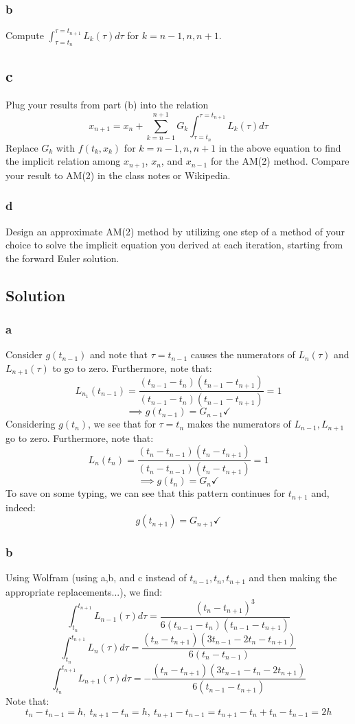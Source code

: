 \documentclass[11pt]{report}
\theoremstyle{definition}
\begin{document}
\subsubsection*{b}
Compute $\int_{\tau=t_n}^{\tau=t_{n+1}}L_{k}(\tau)d\tau$ for $k=n-1,n,n+1$.

\subsection*{c}
Plug your results from part (b) into the relation
\[
	x_{n+1} = x_n + \sum_{k=n-1}^{n+1}G_k\int_{\tau=t_n}^{\tau=t_{n+1}}L_k(\tau)d\tau
\]
Replace $G_k$ with $f(t_k, x_k)$ for $k=n-1,n,n+1$ in the above equation to find
the implicit relation among $x_{n+1}$, $x_n$, and $x_{n-1}$ for the AM(2)
method. Compare your result to AM(2) in the class notes or Wikipedia.

\subsubsection*{d}
Design an approximate AM(2) method by utilizing one step of a method of your
choice to solve the implicit equation you derived at each iteration, starting
from the forward Euler solution.

\subsection*{Solution}
\subsubsection*{a}
Consider $g(t_{n-1})$ and note that $\tau=t_{n-1}$ causes the numerators
of $L_n(\tau)$ and $L_{n+1}(\tau)$ to go to zero. Furthermore,
note that:
\[
	L_{n_1}(t_{n-1}) =
	\frac{(t_{n-1}-t_n)(t_{n-1}-t_{n+1})}{(t_{n-1}-t_n)(t_{n-1}-t_{n+1})}
	= 1
\]
\[ \implies g(t_{n-1})=G_{n-1}\checkmark\]
Considering $g(t_n)$, we see that for $\tau=t_n$ makes the numerators of
$L_{n-1}, L_{n+1}$ go to zero. Furthermore, note that:
\[
	L_{n}  (t_n) = \frac{(t_n-t_{n-1})(t_n-t_{n+1})}{(t_{n}-t_{n-1})(t_{n}-t_{n+1})}
	= 1
\]
\[\implies g(t_n)=G_n\checkmark\]
To save on some typing, we can see that this pattern continues for $t_{n+1}$
and, indeed:
\[g(t_{n+1}) = G_{n+1}\checkmark\]

\subsubsection*{b}
Using Wolfram (using a,b, and c instead of $t_{n-1},t_n,t_{n+1}$ and then making
the appropriate replacements...), we find:
\[\int_{t_n}^{t_{n+1}}L_{n-1}(\tau)d\tau = \frac{(t_n-t_{n+1})^3}{6(t_{n-1}-t_n)(t_{n-1}-t_{n+1})}\]
\[\int_{t_n}^{t_{n+1}}L_{n}(\tau)d\tau = \frac{(t_{n}-t_{n+1})(3t_{n-1}-2t_{n}-t_{n+1})}{6(t_n-t_{n-1})}\]
\[\int_{t_n}^{t_{n+1}}L_{n+1}(\tau)d\tau = -\frac{(t_{n}-t_{n+1})(3t_{n-1}-t_{n}-2t_{n+1})}{6(t_{n-1}-t_{n+1})}\]
Note that:
\[t_n-t_{n-1} = h,\ t_{n+1}-t_{n} = h,\ t_{n+1}-t_{n-1} = t_{n+1}-t_n+t_n-t_{n-1}=2h\]
\end{document}

